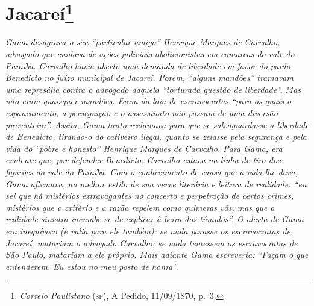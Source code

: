 \chapter{Jacareí\footnote{\emph{Correio Paulistano} (\textsc{sp}), A Pedido, 11/09/1870,
  p.~3.}} %

\begin{didascalia}
\emph{Gama desagrava o seu ``particular amigo'' Henrique Marques de
Carvalho, advogado que cuidava de ações judiciais abolicionistas em
comarcas do vale do Paraíba. Carvalho havia aberto uma demanda de
liberdade em favor do pardo Benedicto no juízo municipal de Jacareí.
Porém, ``alguns mandões'' tramavam uma represália contra o advogado
daquela ``torturada questão de liberdade''. Mas não eram quaisquer
mandões. Eram da laia de escravocratas ``para os quais o espancamento, a
perseguição e o assassinato não passam de uma diversão prazenteira''.
Assim, Gama tanto reclamava para que se salvaguardasse a liberdade de
Benedicto, tirando-o do cativeiro ilegal, quanto se zelasse pela
segurança e pela vida do ``pobre e honesto'' Henrique Marques de Carvalho.
Para Gama, era evidente que, por defender Benedicto, Carvalho estava na
linha de tiro dos figurões do vale do Paraíba. Com o conhecimento de
causa que a vida lhe dava, Gama afirmava, ao melhor estilo de sua verve
literária e leitura de realidade: ``eu sei que há mistérios extravagantes
no concerto e perpetração de certos crimes, mistérios que o critério e a
razão repelem como quimeras vãs, mas que a realidade sinistra incumbe-se
de explicar à beira dos túmulos''. O alerta de Gama era inequívoco (e
valia para ele também): se nada parasse os escravocratas de Jacareí,
matariam o advogado Carvalho; se nada temessem os escravocratas de São
Paulo, matariam a ele próprio. Mais adiante Gama escreveria: ``Façam o
que entenderem. Eu estou no meu posto de honra''.}
\end{didascalia}



